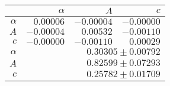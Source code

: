 \begin{table}
\caption{}
\centering
 \begin{tabular}{|r|r|r|r|}
 \hline 
\cellcolor{tabcolor}&\cellcolor{tabcolor}$\alpha$&\cellcolor{tabcolor}$A$&\cellcolor{tabcolor}$c$\\ \hline 
 \cellcolor{tabcolor}$\alpha$&$0.00006$ &$-0.00004$ &$-0.00000$ \\ 
\cellcolor{tabcolor}$A$&$-0.00004$ &$0.00532$ &$-0.00110$ \\ 
\cellcolor{tabcolor}$c$&$-0.00000$ &$-0.00110$ &$0.00029$ \\ \hline \hline
\cellcolor{tabcolor}$\alpha$&\multicolumn{3}{r|}{$0.30305 \pm 0.00792$ }\\ 
\cellcolor{tabcolor}$A$&\multicolumn{3}{r|}{$0.82599 \pm 0.07293$ }\\ 
\cellcolor{tabcolor}$c$&\multicolumn{3}{r|}{$0.25782 \pm 0.01709$ }\\ 
\hline\end{tabular}
\end{table}
